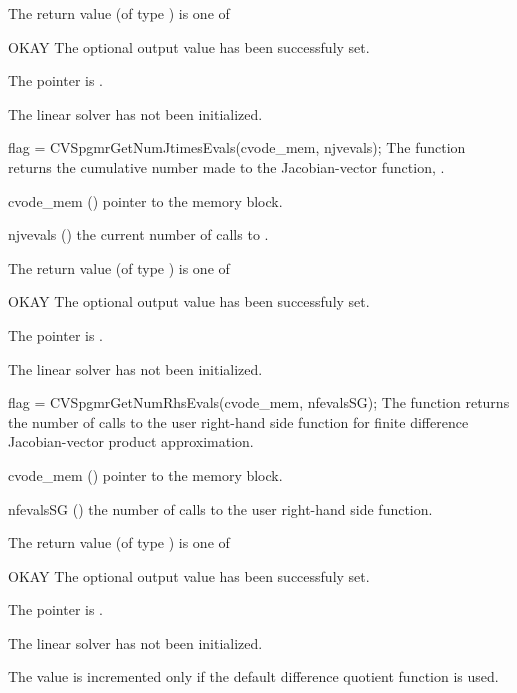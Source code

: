 {
  The return value  (of type ) is one of
  \begin{args}
  \item[OKAY] 
    The optional output value has been successfuly set.
  \item[\Id{LIN\_NO\_MEM}]
    The  pointer is .
  \item[\Id{LIN\_NO\_LMEM}]
    The {\cvspgmr} linear solver has not been initialized.
  \end{args}
}
{}
{
  flag = CVSpgmrGetNumJtimesEvals(cvode\_mem, njvevals);
}
{
  The function  returns the
  cumulative number made to the Jacobian-vector function,
  .
}
{
  \begin{args}
  \item[cvode\_mem] ()
    pointer to the {\cvodes} memory block.
  \item[njvevals] ()
    the current number of calls to .
  \end{args}
}
{
  The return value  (of type ) is one of
  \begin{args}
  \item[OKAY] 
    The optional output value has been successfuly set.
  \item[\Id{LIN\_NO\_MEM}]
    The  pointer is .
  \item[\Id{LIN\_NO\_LMEM}]
    The {\cvspgmr} linear solver has not been initialized.
  \end{args}
}
{}
{
  flag = CVSpgmrGetNumRhsEvals(cvode\_mem, nfevalsSG);
}
{
  The function  returns the
  number of calls to the user right-hand side function for
  finite difference Jacobian-vector product approximation.
}
{
  \begin{args}
  \item[cvode\_mem] ()
    pointer to the {\cvodes} memory block.
  \item[nfevalsSG] ()
    the number of calls to the user right-hand side function.
  \end{args}
}
{
  The return value  (of type ) is one of
  \begin{args}
  \item[OKAY] 
    The optional output value has been successfuly set.
  \item[\Id{LIN\_NO\_MEM}]
    The  pointer is .
  \item[\Id{LIN\_NO\_LMEM}]
    The {\cvspgmr} linear solver has not been initialized.
  \end{args}
}
{
  The value  is incremented only if the default 
   difference quotient function is used.
}

